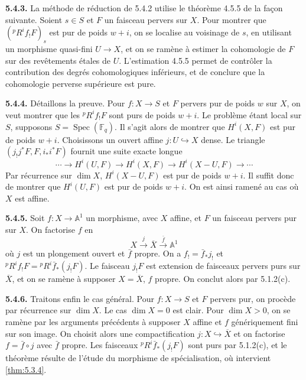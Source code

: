 \documentclass[12pt,a4paper]{article}
\theoremstyle{plain}
\theoremstyle{definition}
\DeclareMathOperator{\Spec}{Spec}
\newcommand{\into}{\hookrightarrow}
\providecommand{\Spec}{\operatorname{Spec}}
\begin{document}
\noindent\textbf{5.4.3.} La m\'{e}thode de r\'{e}duction de 5.4.2 utilise le th\'{e}or\`{e}me 4.5.5 de la fa\c{c}on suivante. Soient $s \in S$ et $F$ un faisceau pervers sur $X$. Pour montrer que $({}^{p}R^{i}f_{!}F)_{s}$ est pur de poids $w+i$, on se localise au voisinage de $s$, en utilisant un morphisme quasi-fini $U \to X$, et on se ram\`{e}ne \`{a} estimer la cohomologie de $F$ sur des rev\^{e}tements \'{e}tales de $U$. L'estimation 4.5.5 permet de contr\^{o}ler la contribution des degr\'{e}s cohomologiques inf\'{e}rieurs, et de conclure que la cohomologie perverse sup\'{e}rieure est pure.

\noindent\textbf{5.4.4.} D\'{e}taillons la preuve. Pour $f: X \to S$ et $F$ pervers pur de poids $w$ sur $X$, on veut montrer que les ${}^{p}R^{i}f_{!}F$ sont purs de poids $w+i$. Le probl\`{e}me \'{e}tant local sur $S$, supposons $S = \Spec(\mathbb{F}_{q})$. Il s'agit alors de montrer que $H^{i}(X,F)$ est pur de poids $w+i$. Choisissons un ouvert affine $j: U \into X$ dense. Le triangle $(j_{!}j^{*}F, F, i_{*}i^{*}F)$ fournit une suite exacte longue
\[
\cdots \to H^{i}(U,F) \to H^{i}(X,F) \to H^{i}(X-U,F) \to \cdots
\]
Par r\'{e}currence sur $\dim X$, $H^{i}(X-U,F)$ est pur de poids $w+i$. Il suffit donc de montrer que $H^{i}(U,F)$ est pur de poids $w+i$. On est ainsi ramen\'{e} au cas o\`{u} $X$ est affine.

\noindent\textbf{5.4.5.} Soit $f: X \to \mathbb{A}^{1}$ un morphisme, avec $X$ affine, et $F$ un faisceau pervers pur sur $X$. On factorise $f$ en
\[
X \xrightarrow{j} \overline{X} \xrightarrow{\bar{f}} \mathbb{A}^{1}
\]
o\`{u} $j$ est un plongement ouvert et $\bar{f}$ propre. On a $f_{!} = \bar{f}_{*}j_{!}$ et ${}^{p}R^{i}f_{!}F = {}^{p}R^{i}\bar{f}_{*}(j_{!}F)$. Le faisceau $j_{!}F$ est extension de faisceaux pervers purs sur $\overline{X}$, et on se ram\`{e}ne \`{a} supposer $X = \overline{X}$, $f$ propre. On conclut alors par 5.1.2(c).

\noindent\textbf{5.4.6.} Traitons enfin le cas g\'{e}n\'{e}ral. Pour $f: X \to S$ et $F$ pervers pur, on proc\`{e}de par r\'{e}currence sur $\dim X$. Le cas $\dim X = 0$ est clair. Pour $\dim X > 0$, on se ram\`{e}ne par les arguments pr\'{e}c\'{e}dents \`{a} supposer $X$ affine et $f$ g\'{e}n\'{e}riquement fini sur son image. On choisit alors une compactification $j: X \into \overline{X}$ et on factorise $f = \bar{f} \circ j$ avec $\bar{f}$ propre. Les faisceaux ${}^{p}R^{i}\bar{f}_{*}(j_{!}F)$ sont purs par 5.1.2(c), et le th\'{e}or\`{e}me r\'{e}sulte de l'\'{e}tude du morphisme de sp\'{e}cialisation, o\`{u} intervient \ref{thm:5.3.4}.
\end{document}
